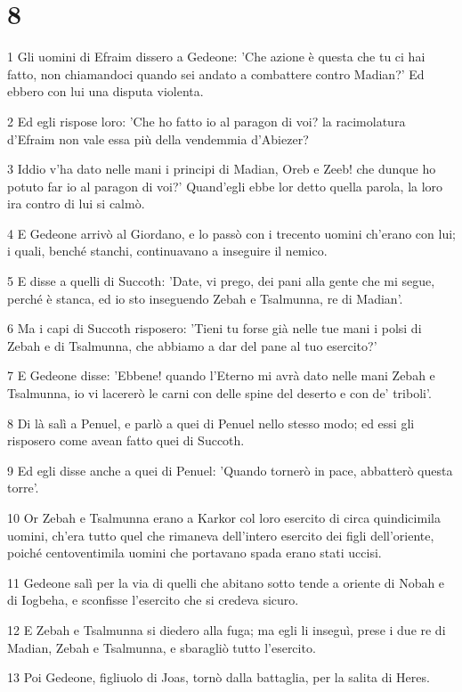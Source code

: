 \chapter{8}

\par 1 Gli uomini di Efraim dissero a Gedeone: 'Che azione è questa che tu ci hai fatto, non chiamandoci quando sei andato a combattere contro Madian?' Ed ebbero con lui una disputa violenta.
\par 2 Ed egli rispose loro: 'Che ho fatto io al paragon di voi? la racimolatura d'Efraim non vale essa più della vendemmia d'Abiezer?
\par 3 Iddio v'ha dato nelle mani i principi di Madian, Oreb e Zeeb! che dunque ho potuto far io al paragon di voi?' Quand'egli ebbe lor detto quella parola, la loro ira contro di lui si calmò.
\par 4 E Gedeone arrivò al Giordano, e lo passò con i trecento uomini ch'erano con lui; i quali, benché stanchi, continuavano a inseguire il nemico.
\par 5 E disse a quelli di Succoth: 'Date, vi prego, dei pani alla gente che mi segue, perché è stanca, ed io sto inseguendo Zebah e Tsalmunna, re di Madian'.
\par 6 Ma i capi di Succoth risposero: 'Tieni tu forse già nelle tue mani i polsi di Zebah e di Tsalmunna, che abbiamo a dar del pane al tuo esercito?'
\par 7 E Gedeone disse: 'Ebbene! quando l'Eterno mi avrà dato nelle mani Zebah e Tsalmunna, io vi lacererò le carni con delle spine del deserto e con de' triboli'.
\par 8 Di là salì a Penuel, e parlò a quei di Penuel nello stesso modo; ed essi gli risposero come avean fatto quei di Succoth.
\par 9 Ed egli disse anche a quei di Penuel: 'Quando tornerò in pace, abbatterò questa torre'.
\par 10 Or Zebah e Tsalmunna erano a Karkor col loro esercito di circa quindicimila uomini, ch'era tutto quel che rimaneva dell'intero esercito dei figli dell'oriente, poiché centoventimila uomini che portavano spada erano stati uccisi.
\par 11 Gedeone salì per la via di quelli che abitano sotto tende a oriente di Nobah e di Iogbeha, e sconfisse l'esercito che si credeva sicuro.
\par 12 E Zebah e Tsalmunna si diedero alla fuga; ma egli li inseguì, prese i due re di Madian, Zebah e Tsalmunna, e sbaragliò tutto l'esercito.
\par 13 Poi Gedeone, figliuolo di Joas, tornò dalla battaglia, per la salita di Heres.

